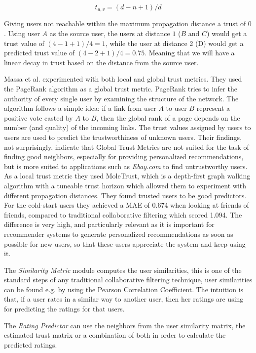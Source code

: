 \begin{equation}
t_{u,v} = (d-n+1)/d
\end{equation}

Giving users not reachable within the maximum propagation distance a trust of
$0$. Using user $A$ as the source user, the users at distance $1$ ($B$ and $C$)
would get a trust value of $(4-1+1)/4 = 1$, while the user at distance 2 (D)
would get a predicted trust value of $(4-2+1)/4 = 0.75$. Meaning that we will
have a linear decay in trust based on the distance from the source user.

Massa et al. \cite{Massa2007} experimented with both local and global trust
metrics. They used the PageRank algorithm as a global trust metric. PageRank
tries to infer the authority of every single user by examining the structure of
the network. The algorithm follows a simple idea: if a link from user $A$ to
user $B$ represent a positive vote casted by $A$ to $B$, then the global rank
of a page depends on the number (and quality) of the incoming links. The trust
values assigned by users to users are used to predict the trustworthiness of
unknown users. Their findings, not surprisingly, indicate that Global Trust
Metrics are not suited for the task of finding good neighbors, especially for
providing personalized recommendations, but is more suited to applications such
as \emph{Ebay.com} to find untrustworthy users. As a local trust metric they
used MoleTrust, which is a depth-first graph walking algorithm with a tuneable
trust horizon which allowed them to experiment with different propagation
distances. They found trusted users to be good predictors. For the cold-start
users they achieved a MAE of 0.674 when looking at friends of friends, compared
to traditional collaborative filtering which scored 1.094. The difference is
very high, and particularly relevant as it is important for recommender systems
to generate personalized recommendations as soon as possible for new users, so
that these users appreciate the system and keep using it.

The \emph{Similarity Metric} module computes the user similarities, this is one
of the standard steps of any traditional collaborative filtering technique,
user similarities can be found e.g. by using the Pearson Correlation
Coefficient. The intuition is that, if a user rates in a similar way to another
user, then her ratings are using for predicting the ratings for that users.

The \emph{Rating Predictor} can use the neighbors from the user similarity
matrix, the estimated trust matrix or a combination of both in order to
calculate the predicted ratings.

